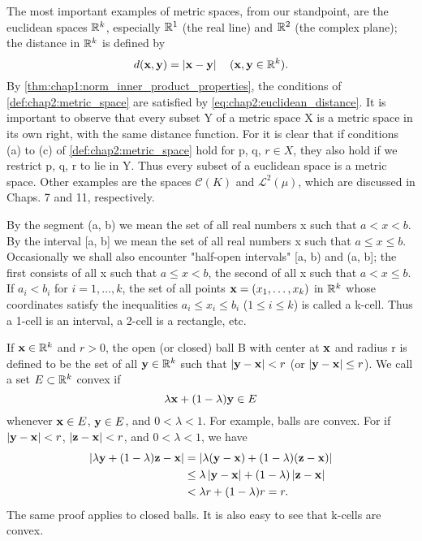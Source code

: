 \begin{example} %
  \label{ex:chap2:metric_space_examples}
  The most important examples of metric spaces, from our standpoint,
  are the euclidean spaces $\mathbb{R}^k$, especially $\mathbb{R}^1$ (the real line)
  and $\mathbb{R}^2$ (the complex plane); the distance in $\mathbb{R}^k$ is defined by
  \begin{equation} \label{eq:chap2:euclidean_distance}
    d(\mathbf{x}, \mathbf{y}) = \left\lvert \mathbf{x} - \mathbf{y} \right\rvert \quad
    (\mathbf{x}, \mathbf{y} \in \mathbb{R}^k).
  \end{equation}
  By \autoref{thm:chap1:norm_inner_product_properties}, the
  conditions of \autoref{def:chap2:metric_space} are satisfied by
  \eqref{eq:chap2:euclidean_distance}.
  It is important to observe that every subset Y of a metric space X
  is a metric space in its own right, with the same distance
  function. For it is clear that if conditions (a) to (c) of
  \autoref{def:chap2:metric_space} hold for p, q, $r \in X$, they
  also hold if we restrict p, q, r to lie in Y.
  Thus every subset of a euclidean space is a metric space. Other
  examples are the spaces $\mathcal{C}(K)$ and $\mathcal{L}^2(\mu)$,
  which are discussed in Chaps. 7 and 11, respectively.
\end{example}

\begin{definition} %
  \label{def:chap2:intervals_balls_convex}
  By the segment (a, b) we mean the set of all real numbers x such
  that $a < x < b$.
  By the interval [a, b] we mean the set of all real numbers x such
  that $a \le x \le b$.
  Occasionally we shall also encounter "half-open intervals" [a, b)
  and (a, b]; the first consists of all x such that $a \le x < b$,
  the second of all x such that $a < x \le b$.
  If $a_i < b_i$ for $i=1, \dots, k$, the set of all points $\mathbf{x}
  = (x_1, \dots, x_k)$ in $\mathbb{R}^k$ whose coordinates satisfy the
  inequalities $a_i \le x_i \le b_i$ ($1 \le i \le k$) is called a
  k-cell. Thus a 1-cell is an interval, a 2-cell is a rectangle, etc.

  If $\mathbf{x} \in \mathbb{R}^k$ and $r>0$, the open (or closed) ball B with
  center at $\mathbf{x}$ and radius r is defined to be the set of all
  $\mathbf{y} \in \mathbb{R}^k$ such that $\left\lvert \mathbf{y} - \mathbf{x} \right\rvert < r$ (or
  $\left\lvert \mathbf{y} - \mathbf{x} \right\rvert \le r$).
  We call a set $E \subset \mathbb{R}^k$ convex if
  \[ \lambda \mathbf{x} + (1-\lambda)\mathbf{y} \in E \]
  whenever $\mathbf{x} \in E$, $\mathbf{y} \in E$, and $0 < \lambda < 1$.
  For example, balls are convex. For if $\left\lvert \mathbf{y} - \mathbf{x} \right\rvert <
  r$, $\left\lvert \mathbf{z} - \mathbf{x} \right\rvert < r$, and $0 < \lambda < 1$, we have
  \begin{align*}
    \left\lvert \lambda \mathbf{y} + (1-\lambda)\mathbf{z} - \mathbf{x} \right\rvert &=
    \left\lvert \lambda(\mathbf{y} - \mathbf{x}) + (1-\lambda)(\mathbf{z} - \mathbf{x}) \right\rvert \\
    &\le \lambda\left\lvert \mathbf{y} - \mathbf{x} \right\rvert + (1-\lambda)\left\lvert \mathbf{z}
    - \mathbf{x} \right\rvert \\
    &< \lambda r + (1-\lambda)r = r.
  \end{align*}
  The same proof applies to closed balls. It is also easy to see that
  k-cells are convex.
\end{definition}

